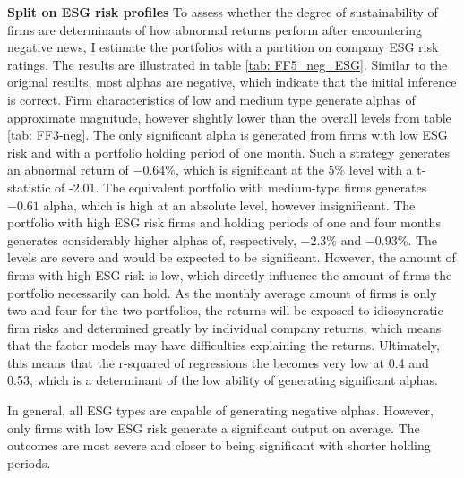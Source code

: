 \textbf{Split on ESG risk profiles}
To assess whether the degree of sustainability of firms are determinants of how abnormal returns perform after encountering negative news, I estimate the portfolios with a partition on company ESG risk ratings. The results are illustrated in table \ref{tab: FF5_neg_ESG}. Similar to the original results, most alphas are negative, which indicate that the initial inference is correct. Firm characteristics of low and medium type generate alphas of approximate magnitude, however slightly lower than the overall levels from table \ref{tab: FF3-neg}. The only significant alpha is generated from firms with low ESG risk and with a portfolio holding period of one month. Such a strategy generates an abnormal return of $-0.64\%$, which is significant at the $5\%$ level with a t-statistic of -2.01. The equivalent portfolio with medium-type firms generates $-0.61$ alpha, which is high at an absolute level, however insignificant. The portfolio with high ESG risk firms and holding periods of one and four months generates considerably higher alphas of, respectively, $-2.3\%$ and $-0.93\%$. The levels are severe and would be expected to be significant. However, the amount of firms with high ESG risk is low, which directly influence the amount of firms the portfolio necessarily can hold. As the monthly average amount of firms is only two and four for the two portfolios, the returns will be exposed to idiosyncratic firm risks and determined greatly by individual company returns, which means that the factor models may have difficulties explaining the returns. Ultimately, this means that the r-squared of regressions the becomes very low at 0.4 and 0.53, which is a determinant of the low ability of generating significant alphas. 

In general, all ESG types are capable of generating negative alphas. However, only firms with low ESG risk generate a significant output on average. The outcomes are most severe and closer to being significant with shorter holding periods.   



